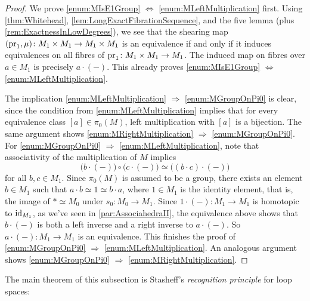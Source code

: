 \begin{proof}
	We prove \cref{enum:MIsE1Group} $\Leftrightarrow$ \cref{enum:MLeftMultiplication} first. Using \cref{thm:Whitehead}, \cref{lem:LongExactFibrationSequence}, and the five lemma (plus \cref{rem:ExactnessInLowDegrees}), we see that the shearing map $(\operatorname{pr}_1,\mu)\colon M_1\times M_1\rightarrow M_1\times M_1$ is an equivalence if and only if it induces equivalences on all fibres of $\operatorname{pr}_1\colon M_1\times M_1\rightarrow M_1$. The induced map on fibres over $a\in M_1$ is precisely $a\cdot (-)$. This already proves \cref{enum:MIsE1Group} $\Leftrightarrow$ \cref{enum:MLeftMultiplication}.
	
	The implication \cref{enum:MLeftMultiplication} $\Rightarrow$ \cref{enum:MGroupOnPi0} is clear, since the condition from \cref{enum:MLeftMultiplication} implies that for every equivalence class $[a]\in\pi_0(M)$, left multiplication with $[a]$ is a bijection. The same argument shows \cref{enum:MRightMultiplication} $\Rightarrow$ \cref{enum:MGroupOnPi0}. For \cref{enum:MGroupOnPi0} $\Rightarrow$ \cref{enum:MLeftMultiplication}, note that associativity of the multiplication of $M$ implies
	\begin{equation*}
		\bigl(b\cdot(-)\bigr)\circ \bigl(c\cdot (-)\bigr)\simeq \bigl((b\cdot c)\cdot (-)\bigr) 
	\end{equation*}
	for all $b,c\in M_1$. Since $\pi_0(M)$ is assumed to be a group, there exists an element $b\in M_1$ such that $a\cdot b\simeq 1\simeq b\cdot a$, where $1\in M_1$ is the identity element, that is, the image of $*\simeq M_0$ under $s_0\colon M_0\rightarrow M_1$. Since $1\cdot (-)\colon M_1\rightarrow M_1$ is homotopic to $\operatorname{id}_{M_1}$, as we've seen in \cref{par:AssociahedraII}, the equivalence above shows that $b\cdot (-)$ is both a left inverse and a right inverse to $a\cdot (-)$. So $a\cdot (-)\colon M_1\rightarrow M_1$ is an equivalence. This finishes the proof of \cref{enum:MGroupOnPi0} $\Rightarrow$ \cref{enum:MLeftMultiplication}. An analogous argument shows \cref{enum:MGroupOnPi0} $\Rightarrow$ \cref{enum:MRightMultiplication}.
\end{proof}
The main theorem of this subsection is Stasheff's \emph{recognition principle} for loop spaces:
